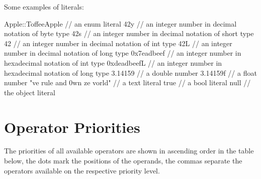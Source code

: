 \begin{example}
Some examples of literals:
\begin{grgen}
Apple::ToffeeApple // an enum literal
42y // an integer number in decimal notation of byte type
42s // an integer number in decimal notation of short type
42 // an integer number in decimal notation of int type
42L // an integer number in decimal notation of long type
0x7eadbeef // an integer number in hexadecimal notation of int type
0xdeadbeefL // an integer number in hexadecimal notation of long type
3.14159 // a double number
3.14159f // a float number
"ve rule and 0wn ze vorld" // a text literal
true // a bool literal
null // the object literal
\end{grgen}
\end{example}

\pagebreak

\section{Operator Priorities}

The priorities of all available operators are shown in ascending order in the table below, the dots mark the positions of the operands, the commas separate the operators available on the respective priority level.

